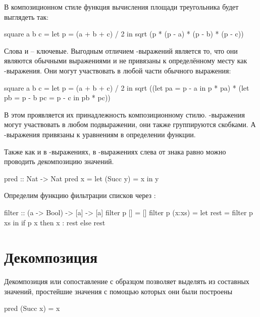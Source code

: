 В композиционном стиле функция вычисления площади треугольника будет
выглядеть так:


\begin{code}
square a b c = let p = (a + b + c) / 2
               in  sqrt (p * (p - a) * (p - b) * (p - c)) 
\end{code}

Слова   и  -- ключевые. Выгодным отличием
-выражений является то, что они являются обычными выражениями и
не привязаны к определённому месту как -выражения. Они могут
участвовать в любой части обычного выражения:


\begin{code}
square a b c = let p = (a + b + c) / 2
               in  sqrt ((let pa = p - a in p * pa) * 
                         (let pb = p - b
                              pc = p - c  
                          in  pb * pc)) 
\end{code}

В этом проявляется их принадлежность композиционному стилю.
-выражения могут участвовать в любом подвыражении, они также
группируются скобками. А -выражения привязаны к уравнениям в
определении функции.

Также как и в -выражениях, в -выражениях слева от
знака равно можно проводить декомпозицию значений.


\begin{code}
pred :: Nat -> Nat
pred x = let (Succ y) = x
         in  y
\end{code}

Определим функцию фильтрации списков через :


\begin{code}
filter :: (a -> Bool) -> [a] -> [a]
filter  p  []     = []
filter  p  (x:xs) = 
    let rest = filter p xs
    in  if p x then x : rest else rest
\end{code}

\section{Декомпозиция}

Декомпозиция или сопоставление с образцом позволяет выделять из
составных значений, простейшие значения с помощью которых они были
построены


\begin{code}
pred (Succ x) = x
\end{code}

